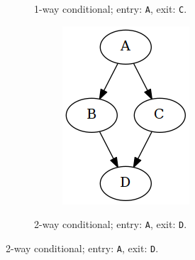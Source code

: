 \begin{figure}[htbp]
\begin{subfigure}[ht]{0.23\textwidth}
\begin{subfigure}[ht]{0.42\textwidth}
		\end{subfigure}
		\caption{1-way conditional; entry: \texttt{A}, exit: \texttt{C}.}
		\label{fig:if_graph_representation}
	\end{subfigure}
	\qquad
	\begin{subfigure}[ht]{0.28\textwidth}
		\centering
		\begin{subfigure}[ht]{0.45\textwidth}
			
		\end{subfigure}
		\begin{subfigure}[ht]{0.50\textwidth}
			\includegraphics[width=\textwidth]{inc/primitives/if_else.png}
		\end{subfigure}
		\caption{2-way conditional; entry: \texttt{A}, exit: \texttt{D}.}
		\label{fig:if_else_graph_representation}
	\end{subfigure}

\end{figure}
